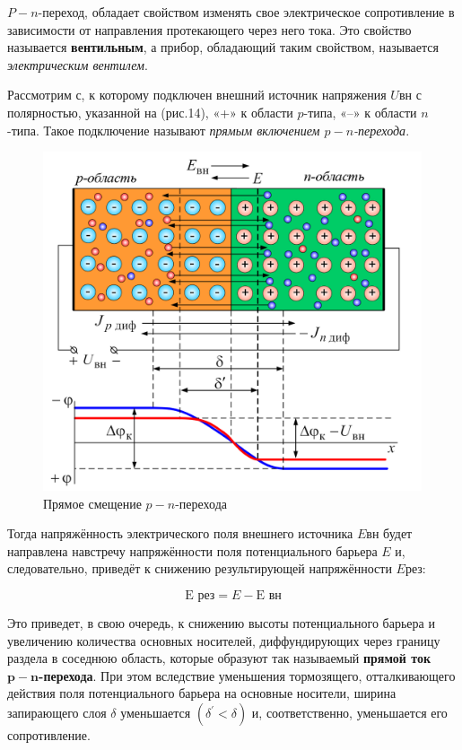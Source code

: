     \par \(P-n\)-переход, обладает свойством изменять свое электрическое сопротивление в зависимости от направления протекающего через него тока. Это свойство называется \textbf{вентильным}, а прибор, обладающий таким свойством, называется \textit{электрическим вентилем}.
    
    \par Рассмотрим с, к которому подключен внешний источник напряжения \(U\)вн с полярностью, указанной на (рис.14), «+» к области \(p\)-типа, «–» к области \(n\)-типа. Такое подключение называют \textit{прямым включением \(p-n\)-перехода}.
    
    \begin{figure}[h]
    	\centering
    	\includegraphics[height=10cm]{img/15} 
    	\captionsetup{font=footnotesize}
    	\caption{Прямое смещение \(p-n\)-перехода} 
    \end{figure}
    
    \par Тогда напряжённость электрического поля внешнего источника \(E\)вн будет направлена навстречу напряжённости поля потенциального барьера \(E\) и, следовательно, приведёт к снижению результирующей напряжённости \(E\)рез:
    
    \begin{equation}
    	   \text{E рез} = E - \text{E вн}
    \end{equation}
    
    \par Это приведет, в свою очередь, к снижению высоты потенциального барьера и увеличению количества основных носителей, диффундирующих через границу раздела в соседнюю область, которые образуют так называемый \textbf{прямой ток $\boldsymbol{p-n}$-перехода}. При этом вследствие уменьшения тормозящего, отталкивающего действия поля потенциального барьера на основные носители, ширина запирающего слоя $\delta$ уменьшается $(\delta^{'} <  \delta)$ и, соответственно, уменьшается его сопротивление.
    
